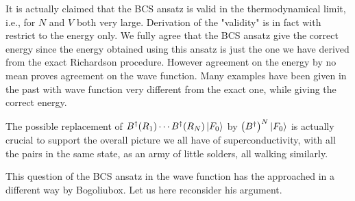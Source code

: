 \documentclass[aps,prb,amsmath,amssymb,preprint,superscriptaddress]{revtex4-1}
\newcommand{\fo}{\ensuremath{\ket{F_0}}}
\begin{document}
It is actually claimed that the BCS ansatz is valid in the thermodynamical limit, i.e., for $N$ and $V$ both very large.  Derivation of the "validity" is in fact with restrict to the energy only. We fully agree that the BCS ansatz give the correct energy since the energy obtained using this ansatz is just the one we have derived from the exact Richardson procedure.  However agreement on the energy by no mean proves agreement on the wave function. Many examples have been given in the past with wave function very different from the exact one, while giving the correct energy.  

The possible replacement of $B^{\dagger}(R_1)\cdots{}B^{\dagger}(R_N)\fo$ by $\br{B^{\dagger}}^N\fo$ is actually crucial to support the overall picture we all have of superconductivity, with all the pairs in the same state, as an army of little solders, all walking similarly.  

This question of the BCS ansatz in the wave function has the approached in a different way by Bogoliubox.  Let us here reconsider his argument.  

%

\end{document}
